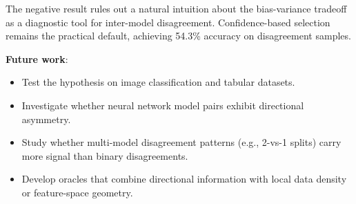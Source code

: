 \documentclass[11pt,letterpaper]{article}
\begin{document}
The negative result rules out a natural intuition about the bias-variance tradeoff as a diagnostic tool for inter-model disagreement. Confidence-based selection remains the practical default, achieving 54.3\% accuracy on disagreement samples.

\noindent\textbf{Future work}:
\begin{itemize}
  \item Test the hypothesis on image classification and tabular datasets.
  \item Investigate whether neural network model pairs exhibit directional asymmetry.
  \item Study whether multi-model disagreement patterns (e.g., 2-vs-1 splits) carry more signal than binary disagreements.
  \item Develop oracles that combine directional information with local data density or feature-space geometry.
\end{itemize}



\end{document}
